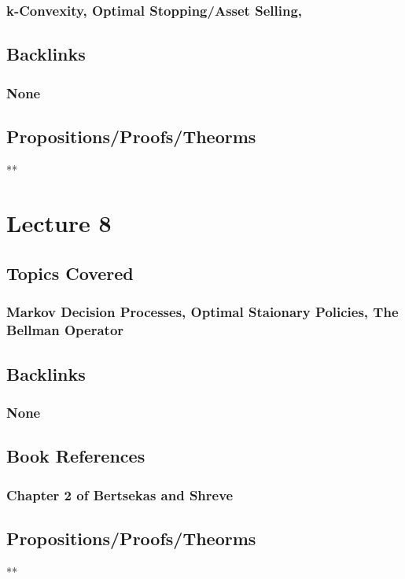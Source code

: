 \documentclass[11pt]{article}
\begin{document}
\subsubsection*{k-Convexity, Optimal Stopping/Asset Selling,}
\label{sec:org9ca5f09}
\subsection*{Backlinks}
\label{sec:org82ccb3e}
\subsubsection*{None}
\label{sec:orgd6d6f0e}
\subsection*{Propositions/Proofs/Theorms}
\label{sec:orgc4af4b1}
**

\section*{Lecture 8}
\label{sec:org91363a4}
\subsection*{Topics Covered}
\label{sec:orgef4189b}
\subsubsection*{Markov Decision Processes, Optimal Staionary Policies, The Bellman Operator}
\label{sec:org8341914}
\subsection*{Backlinks}
\label{sec:orga816865}
\subsubsection*{None}
\label{sec:orgc83a758}
\subsection*{Book References}
\label{sec:org6332a6e}
\subsubsection*{Chapter 2 of Bertsekas and Shreve}
\label{sec:org530cc7d}
\subsection*{Propositions/Proofs/Theorms}
\label{sec:org0ef15bf}
**
\end{document}
